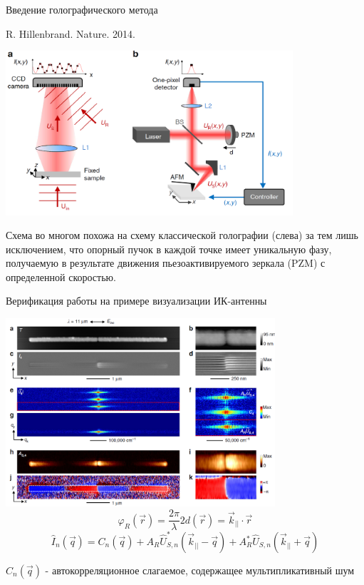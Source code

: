 \documentclass[9pt, compress, xcolor=table]{beamer}
\begin{document}
\begin{frame}{Введение голографического метода}

R. Hillenbrand. Nature. 2014.
\begin{center}
\includegraphics[width=0.8\textwidth]{hillen_1}

Схема во многом похожа на схему классической голографии (слева) за тем лишь исключением, что опорный пучок в каждой точке имеет уникальную фазу, получаемую в результате движения пьезоактивируемого зеркала (PZM) с определенной скоростью.

\end{center}
\end{frame}

\begin{frame}{Верификация работы на примере визуализации ИК-антенны}

\begin{center}
\includegraphics[width=0.75\textwidth]{hillen_2}
\begin{equation*}
    \varphi_R (\vec r) = \frac{2\pi}{\lambda}2d(\vec r)=\vec k_{||}\cdot \vec r
\end{equation*}
\begin{equation*}
    \hat I_n (\vec q) = C_n (\vec q)+A_R \hat U^*_{S,n}(\vec k_{||}-\vec q)+A_R^* \hat U_{S,n}(\vec k_{||}+\vec q)
\end{equation*}

$ C_n (\vec q)$ - автокорреляционное слагаемое, содержащее мультипликативный шум

\end{center}
\end{frame}
\end{document}
